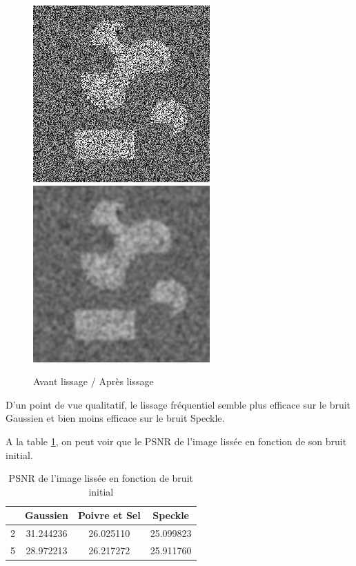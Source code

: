 \documentclass[paper=a4, fontsize=11pt]{scrartcl} %
\begin{document}
\begin{figure}[h!]
\caption{Avant lissage / Après lissage}
\label{SP2}
\centering
\includegraphics[scale=0.6]{images/rapport/sp/formes2sp5.png} 
\includegraphics[scale=0.6]{images/rapport/sp/sp5sig2.png} 
\end{figure}


D'un point de vue qualitatif, le lissage fréquentiel semble plus efficace sur le bruit Gaussien et bien moins efficace sur le bruit Speckle. 

A la table \ref{typebruitpnsr}, on peut voir que le PSNR de l'image lissée en fonction de son bruit initial.

\begin{table}
\caption{PSNR de l'image lissée en fonction de bruit initial}
\label{typebruitpnsr}
\centering
\begin{tabular}{|l|c|c|c|}
\hline
	\backslashbox{$\sigma$}{Type de bruit} & Gaussien & Poivre et Sel & Speckle \\
	\hline
	2 & 31.244236 & 26.025110 & 25.099823 \\
	\hline
	5 & 28.972213 & 26.217272 & 25.911760 \\
	\hline
\end{tabular}

\end{table}
\end{document}

